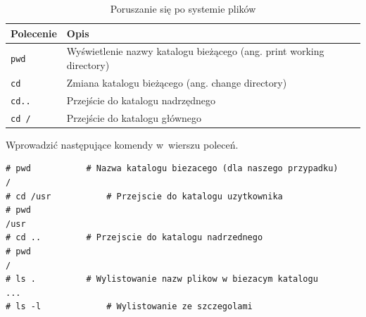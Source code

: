 \begin{example}
\begin{example}
\begin{table}[h!]
\centering
\caption{Poruszanie się po systemie plików}
\setlength{\arrayrulewidth}{1pt}
\setlength{\tabcolsep}{6pt}
\renewcommand{\arraystretch}{1.2}
\begin{tabular}{ |p{}|p{}|}
\hline \rowcolor{gray}
\textbf{Polecenie} & \textbf{Opis} \\ \hline
\mbox{\lstinline[style=MyBashStyle]{pwd}} & Wyświetlenie nazwy katalogu bieżącego (ang. print working directory) \\ \hline
\mbox{\lstinline[style=MyBashStyle]{cd}}  & Zmiana katalogu bieżącego (ang. change directory) \\ \hline
\mbox{\lstinline[style=MyBashStyle]{cd..}} & Przejście do katalogu nadrzędnego \\ \hline
\mbox{\lstinline[style=MyBashStyle]{cd /}} & Przejście do katalogu głównego \\ \hline
\end{tabular}
\label{tab:poruszanie}
\end{table}
\end{example}



Wprowadzić następujące komendy w~wierszu poleceń.

\begin{lstlisting}[style=MyBashStyle]
# pwd			# Nazwa katalogu biezacego (dla naszego przypadku)
/
# cd /usr			# Przejscie do katalogu uzytkownika
# pwd
/usr
# cd ..			# Przejscie do katalogu nadrzednego
# pwd
/
# ls .			# Wylistowanie nazw plikow w biezacym katalogu
...
# ls -l 			# Wylistowanie ze szczegolami
\end{lstlisting}
\end{example}

